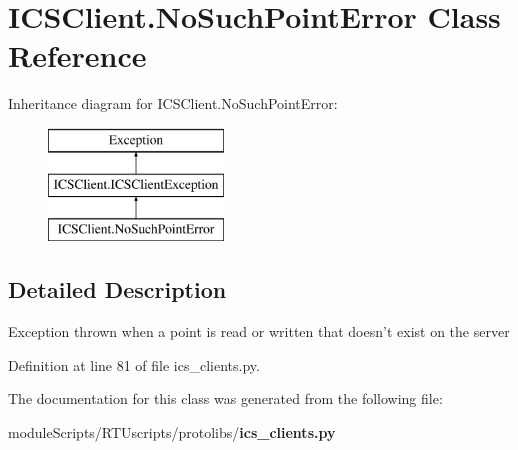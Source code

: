 \section{I\+C\+S\+Client.\+No\+Such\+Point\+Error Class Reference}
\label{classprotolibs_1_1ics__clients_1_1_i_c_s_client_1_1_no_such_point_error}
Inheritance diagram for I\+C\+S\+Client.\+No\+Such\+Point\+Error\+:\begin{figure}[H]
\begin{center}
\leavevmode
\includegraphics[height=3.000000cm]{classprotolibs_1_1ics__clients_1_1_i_c_s_client_1_1_no_such_point_error}
\end{center}
\end{figure}


\subsection{Detailed Description}
\begin{DoxyVerb}Exception thrown when a point is read or written that doesn't exist
    on the server\end{DoxyVerb}
 

Definition at line 81 of file ics\+\_\+clients.\+py.



The documentation for this class was generated from the following file\+:\begin{DoxyCompactItemize}
\item 
module\+Scripts/\+R\+T\+Uscripts/protolibs/{\bf ics\+\_\+clients.\+py}\end{DoxyCompactItemize}
